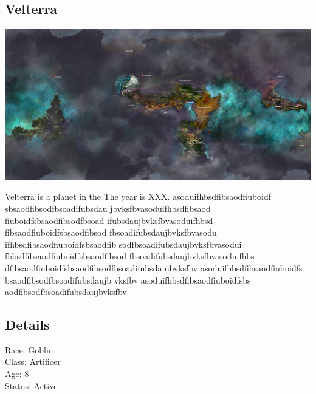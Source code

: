 
\begin{multicols}{1}

\section{Velterra}

\vspace{5mm}

\begin{center}
\includegraphics[width=180mm]{./content/img/velterraMap.png}
\begin{figure}[h]
\end{figure}
\end{center}

\end{multicols}

\begin{multicols}{2}


Velterra is a planet in the   The year is XXX. asoduifhbsdfibsaodfiuboidf
sbsaodfibsodfbsoadifubsdau
jbvksfbvasoduifhbsdfibsaod
fiuboidfsbsaodfibsodfbsoad
ifubsdaujbvksfbvasoduifhbsd
fibsaodfiuboidfsbsaodfibsod
fbsoadifubsdaujbvksfbvasodu
ifhbsdfibsaodfiuboidfsbsaodfib
sodfbsoadifubsdaujbvksfbvasodui
fhbsdfibsaodfiuboidfsbsaodfibsod
fbsoadifubsdaujbvksfbvasoduifhbs
dfibsaodfiuboidfsbsaodfibsodfbsoadifubsdaujbvksfbv
asoduifhbsdfibsaodfiuboidfs
bsaodfibsodfbsoadifubsdaujb
vksfbv
asoduifhbsdfibsaodfiuboidfsbs
aodfibsodfbsoadifubsdaujbvksfbv


\subsection*{Details} 

\noindent

Race: 	Goblin \\
Class: 	Artificer \\
Age: 	8 \\
Status: Active 

\end{multicols}

\twocolumn

\clearpage